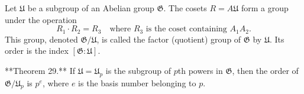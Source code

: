 Let $\mathfrak{U}$ be a subgroup of an Abelian group $\mathfrak{G}$. The cosets $R = A\mathfrak{U}$ form a group under the operation
$$R_1 \cdot R_2 = R_3 \quad \text{where } R_3 \text{ is the coset containing } A_1 A_2.$$
This group, denoted $\mathfrak{G}/\mathfrak{U}$, is called the factor (quotient) group of $\mathfrak{G}$ by $\mathfrak{U}$. Its order is the index $[\mathfrak{G} : \mathfrak{U}]$.

**Theorem 29.** If $\mathfrak{U} = \mathfrak{U}_p$ is the subgroup of $p$th powers in $\mathfrak{G}$, then the order of $\mathfrak{G}/\mathfrak{U}_p$ is $p^e$, where $e$ is the basis number belonging to $p$.
